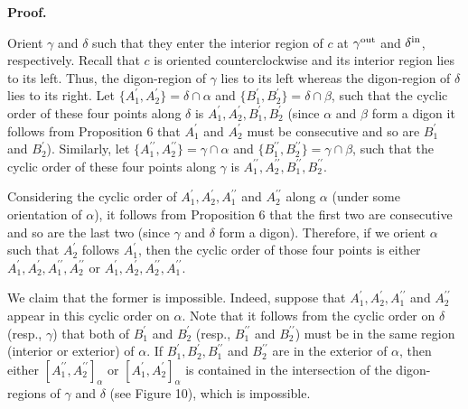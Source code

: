 \documentclass[10pt,a4paper]{amsart}
\begin{document}
\par
\par
\par\medskip\noindent\textbf{Proof.}\par
Orient $\gamma$ and $\delta$ such that they enter the interior region of $c$ at $\gamma^{\rm out}$ and $\delta^{\rm in}$, respectively. Recall that $c$ is oriented counterclockwise and its interior region lies to its left. Thus, the digon-region of $\gamma$ lies to its left whereas the digon-region of $\delta$ lies to its right. Let $\{A^{\prime}_{1},A^{\prime}_{2}\}=\delta\cap\alpha$ and $\{B^{\prime}_{1},B^{\prime}_{2}\}=\delta\cap\beta$, such that the cyclic order of these four points along $\delta$ is $A^{\prime}_{1},A^{\prime}_{2},B^{\prime}_{1},B^{\prime}_{2}$ (since $\alpha$ and $\beta$ form a digon it follows from Proposition 6 that $A_{1}^{\prime}$ and $A^{\prime}_{2}$ must be consecutive and so are $B^{\prime}_{1}$ and $B^{\prime}_{2}$). Similarly, let $\{A^{\prime\prime}_{1},A^{\prime\prime}_{2}\}=\gamma\cap\alpha$ and $\{B^{\prime\prime}_{1},B^{\prime\prime}_{2}\}=\gamma\cap\beta$, such that the cyclic order of these four points along $\gamma$ is $A^{\prime\prime}_{1},A^{\prime\prime}_{2},B^{\prime\prime}_{1},B^{\prime\prime%
}_{2}$.
\par
\par
Considering the cyclic order of $A^{\prime}_{1},A^{\prime}_{2},A^{\prime\prime}_{1}$ and $A^{\prime\prime}_{2}$ along $\alpha$ (under some orientation of $\alpha$), it follows from Proposition 6 that the first two are consecutive and so are the last two (since $\gamma$ and $\delta$ form a digon). Therefore, if we orient $\alpha$ such that $A^{\prime}_{2}$ follows $A^{\prime}_{1}$, then the cyclic order of those four points is either $A^{\prime}_{1},A^{\prime}_{2},A^{\prime\prime}_{1},A^{\prime\prime}_{2}$ or $A^{\prime}_{1},A^{\prime}_{2},A^{\prime\prime}_{2},A^{\prime\prime}_{1}$.
\par
\par
We claim that the former is impossible. Indeed, suppose that $A^{\prime}_{1},A^{\prime}_{2},A^{\prime\prime}_{1}$ and $A^{\prime\prime}_{2}$ appear in this cyclic order on $\alpha$. Note that it follows from the cyclic order on $\delta$ (resp., $\gamma$) that both of $B^{\prime}_{1}$ and $B^{\prime}_{2}$ (resp., $B^{\prime\prime}_{1}$ and $B^{\prime\prime}_{2}$) must be in the same region (interior or exterior) of $\alpha$. If $B^{\prime}_{1},B^{\prime}_{2},B^{\prime\prime}_{1}$ and $B^{\prime\prime}_{2}$ are in the exterior of $\alpha$, then either $[A^{\prime\prime}_{1},A^{\prime\prime}_{2}]_{\alpha}$ or $[A_{1}^{\prime},A^{\prime}_{2}]_{\alpha}$ is contained in the intersection of the digon-regions of $\gamma$ and $\delta$ (see Figure 10), which is impossible.
\end{document}
